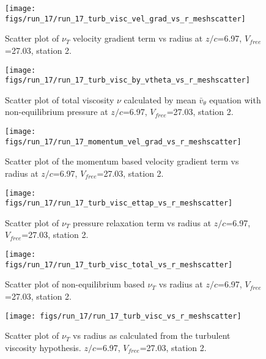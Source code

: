 \begin{figure}[H]
\centering
\texttt{[image: figs/run\_17/run\_17\_turb\_visc\_vel\_grad\_vs\_r\_meshscatter]}
\caption{Scatter plot of $\nu_T$ velocity gradient term vs radius at $z/c$=6.97, $V_{free}$=27.03, station 2.}
\end{figure}


\begin{figure}[H]
\centering
\texttt{[image: figs/run\_17/run\_17\_turb\_visc\_by\_vtheta\_vs\_r\_meshscatter]}
\caption{Scatter plot of total viscosity $\nu$ calculated by mean $\bar{v}_{\theta}$ equation with non-equilibrium pressure at $z/c$=6.97, $V_{free}$=27.03, station 2.}
\end{figure}


\begin{figure}[H]
\centering
\texttt{[image: figs/run\_17/run\_17\_momentum\_vel\_grad\_vs\_r\_meshscatter]}
\caption{Scatter plot of the momentum based velocity gradient term vs radius at $z/c$=6.97, $V_{free}$=27.03, station 2.}
\end{figure}


\begin{figure}[H]
\centering
\texttt{[image: figs/run\_17/run\_17\_turb\_visc\_ettap\_vs\_r\_meshscatter]}
\caption{Scatter plot of $\nu_T$ pressure relaxation term vs radius at $z/c$=6.97, $V_{free}$=27.03, station 2.}
\end{figure}


\begin{figure}[H]
\centering
\texttt{[image: figs/run\_17/run\_17\_turb\_visc\_total\_vs\_r\_meshscatter]}
\caption{Scatter plot of non-equilibrium based $\nu_T$ vs radius at $z/c$=6.97, $V_{free}$=27.03, station 2.}
\end{figure}


\begin{figure}[H]
\centering
\texttt{[image: figs/run\_17/run\_17\_turb\_visc\_vs\_r\_meshscatter]}
\caption{Scatter plot of $\nu_T$ vs radius as calculated from the turbulent viscosity hypothesis. $z/c$=6.97, $V_{free}$=27.03, station 2.}
\end{figure}


